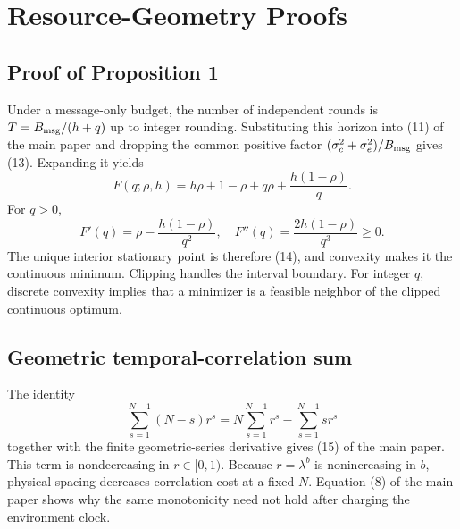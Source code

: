 \section{Resource-Geometry Proofs}
\subsection{Proof of Proposition 1}
Under a message-only budget, the number of independent rounds is $T=B_{\rm msg}/(h+q)$ up to integer rounding.
Substituting this horizon into (11) of the main paper and dropping the common positive factor $(\sigma_c^2+\sigma_e^2)/B_{\rm msg}$ gives (13).
Expanding it yields
\begin{equation}
F(q;\rho,h)=h\rho+1-\rho+q\rho+\frac{h(1-\rho)}{q}.
\end{equation}
For $q>0$,
\begin{equation}
F'(q)=\rho-\frac{h(1-\rho)}{q^2},
\quad
F''(q)=\frac{2h(1-\rho)}{q^3}\ge0.
\end{equation}
The unique interior stationary point is therefore (14), and convexity makes it the continuous minimum.
Clipping handles the interval boundary.
For integer $q$, discrete convexity implies that a minimizer is a feasible neighbor of the clipped continuous optimum.

\subsection{Geometric temporal-correlation sum}
The identity
\begin{equation}
\sum_{s=1}^{N-1}(N-s)r^s
=N\sum_{s=1}^{N-1}r^s-\sum_{s=1}^{N-1}sr^s
\end{equation}
together with the finite geometric-series derivative gives (15) of the main paper.
This term is nondecreasing in $r\in[0,1)$.
Because $r=\lambda^b$ is nonincreasing in $b$, physical spacing decreases correlation cost at a fixed $N$.
Equation (8) of the main paper shows why the same monotonicity need not hold after charging the environment clock.

